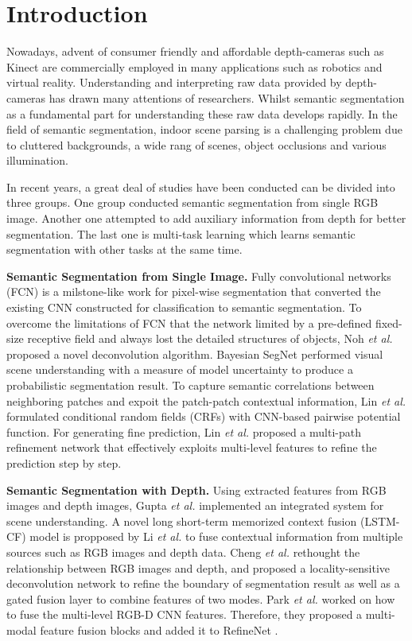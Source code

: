 \section{Introduction}
\label{sec:intro}
Nowadays, advent of consumer friendly and affordable depth-cameras such as Kinect are commercially employed in many applications such as robotics and virtual reality.
%
Understanding and interpreting raw data provided by depth-cameras has drawn many attentions of researchers.
%
Whilst semantic segmentation as a fundamental part for understanding these raw data develops rapidly.
%
In the field of semantic segmentation, indoor scene parsing is a challenging problem due to cluttered backgrounds, a wide rang of scenes, object occlusions and various illumination.


In recent years, a great deal of studies have been conducted can be divided into three groups.
%
One group conducted semantic segmentation from single RGB image.
%
Another one attempted to add auxiliary information from depth for better segmentation.
%
The last one is multi-task learning which learns semantic segmentation with other tasks at the same time.


{\bf Semantic Segmentation from Single Image.}
%
Fully convolutional networks (FCN) is a milstone-like work for pixel-wise segmentation that converted the existing CNN constructed for classification to semantic segmentation.
%
To overcome the limitations of FCN that the network limited by a pre-defined fixed-size receptive field and always lost the detailed structures of objects, Noh \emph{et al.} \cite{Noh2015} proposed a novel deconvolution algorithm. 
%
Bayesian SegNet \cite{Kendall2015} performed visual scene understanding with a measure of model uncertainty to produce a probabilistic segmentation result.
%
To capture semantic correlations between neighboring patches and expoit the
patch-patch contextual information, Lin \emph{et al.} \cite{Lin2016} formulated conditional random fields (CRFs) with CNN-based pairwise potential function. 
%
For generating fine prediction, Lin \emph{et al.} \cite{Lin2017} proposed a multi-path refinement network that effectively exploits multi-level features to refine the prediction step by step.


{\bf Semantic Segmentation with Depth.}
%
Using extracted features from RGB images and depth images, Gupta \emph{et al.} \cite{Gupta2014} implemented an integrated system for scene understanding.
%
 A novel long short-term memorized context fusion (LSTM-CF) model is propposed by Li \emph{et al.} \cite{Li2016} to fuse contextual information from multiple sources such as RGB images and depth data.
% 
Cheng \emph{et al.} \cite{Cheng2017} rethought the relationship between RGB images and depth, and proposed a locality-sensitive deconvolution network to refine the boundary of segmentation result as well as a gated fusion layer to combine features of two modes.
%
Park \emph{et al.} \cite{Park2017} worked on how to fuse the multi-level RGB-D CNN features.
%
Therefore, they proposed a multi-modal feature fusion blocks and added it to RefineNet \cite{Lin2017}.


